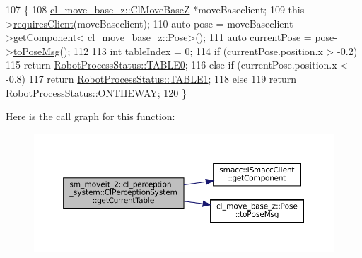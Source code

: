\begin{DoxyCode}
107     \{
108         \hyperlink{classcl__move__base__z_1_1ClMoveBaseZ}{cl\_move\_base\_z::ClMoveBaseZ} *moveBaseclient;
109         this->\hyperlink{classsmacc_1_1ISmaccClient_a7a9990a2f3e35d547671188d69fee520}{requiresClient}(moveBaseclient);
110         \textcolor{keyword}{auto} pose = moveBaseclient->\hyperlink{classsmacc_1_1ISmaccClient_adef78db601749ca63c19e74a27cb88cc}{getComponent}<
      \hyperlink{classcl__move__base__z_1_1Pose}{cl\_move\_base\_z::Pose}>();
111         \textcolor{keyword}{auto} currentPose = pose->\hyperlink{classcl__move__base__z_1_1Pose_a9faf8c6b437ff6b19c8bddd692908dca}{toPoseMsg}();
112 
113         \textcolor{keywordtype}{int} tableIndex = 0;
114         \textcolor{keywordflow}{if} (currentPose.position.x > -0.2)
115             \textcolor{keywordflow}{return} \hyperlink{namespacesm__moveit__2_1_1cl__perception__system_a0044da7c978396e4d81f15af61b4ccb4a1fd65c0ced0ead229bf6dd6a59067a4f}{RobotProcessStatus::TABLE0};
116         \textcolor{keywordflow}{else} \textcolor{keywordflow}{if} (currentPose.position.x < -0.8)
117             \textcolor{keywordflow}{return} \hyperlink{namespacesm__moveit__2_1_1cl__perception__system_a0044da7c978396e4d81f15af61b4ccb4a5b22e42e5d94a94037a4486a4976c49d}{RobotProcessStatus::TABLE1};
118         \textcolor{keywordflow}{else}
119             \textcolor{keywordflow}{return} \hyperlink{namespacesm__moveit__2_1_1cl__perception__system_a0044da7c978396e4d81f15af61b4ccb4a92f7ea3097b3fdb1b7a25669cfc1b8bd}{RobotProcessStatus::ONTHEWAY};
120     \}
\end{DoxyCode}
Here is the call graph for this function\+:
\nopagebreak
\begin{figure}[H]
\begin{center}
\leavevmode
\includegraphics[width=350pt]{classsm__moveit__2_1_1cl__perception__system_1_1ClPerceptionSystem_a581ab2188eb403b8fe1cbc6738d4475f_cgraph}
\end{center}
\end{figure}
\mbox{\label{classsm__moveit__2_1_1cl__perception__system_1_1ClPerceptionSystem_a8df238b74a3ae8482dcb666cae345492}} 

